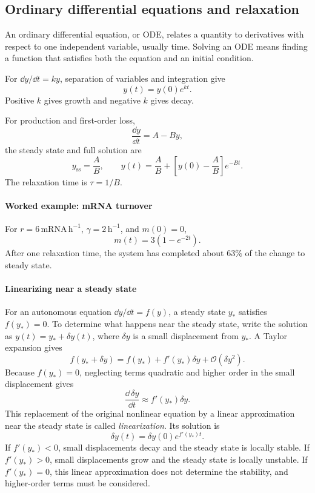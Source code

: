 \subsection{Ordinary differential equations and relaxation}
\label{math:ode}

An ordinary differential equation, or ODE, relates a quantity to derivatives with respect to one independent variable, usually time.
Solving an ODE means finding a function that satisfies both the equation and an initial condition.

For $\dd y/\dd t=ky$, separation of variables and integration give
\[
    y(t)=y(0)e^{kt}.
\]
Positive $k$ gives growth and negative $k$ gives decay.

For production and first-order loss,
\[
    \frac{\dd y}{\dd t}=A-By,
\]
the steady state and full solution are
\[
    y_{\mathrm{ss}}=\frac{A}{B}, \qquad y(t)=\frac{A}{B}+\left[y(0)-\frac{A}{B}\right]e^{-Bt}.
\]
The relaxation time is $\tau=1/B$.

\paragraph{Worked example: mRNA turnover}
For $r=6\,\text{mRNA}\,\mathrm{h}^{-1}$, $\gamma=2\,\mathrm{h}^{-1}$, and $m(0)=0$,
\[
    m(t)=3\left(1-e^{-2t}\right).
\]
After one relaxation time, the system has completed about $63\%$ of the change to steady state.

\paragraph{Linearizing near a steady state}
For an autonomous equation $\dd y/\dd t=f(y)$, a steady state $y_*$ satisfies $f(y_*)=0$.
To determine what happens near the steady state, write the solution as $y(t)=y_*+\delta y(t)$, where $\delta y$ is a small displacement from $y_*$.
A Taylor expansion gives
\[
    f(y_*+\delta y)=f(y_*)+f'(y_*)\delta y+\mathcal{O}(\delta y^2).
\]
Because $f(y_*)=0$, neglecting terms quadratic and higher order in the small displacement gives
\[
    \frac{\dd\,\delta y}{\dd t}\approx f'(y_*)\delta y.
\]
This replacement of the original nonlinear equation by a linear approximation near the steady state is called \emph{linearization}.
Its solution is
\[
    \delta y(t)=\delta y(0)e^{f'(y_*)t}.
\]
If $f'(y_*)<0$, small displacements decay and the steady state is locally stable.
If $f'(y_*)>0$, small displacements grow and the steady state is locally unstable.
If $f'(y_*)=0$, this linear approximation does not determine the stability, and higher-order terms must be considered.


